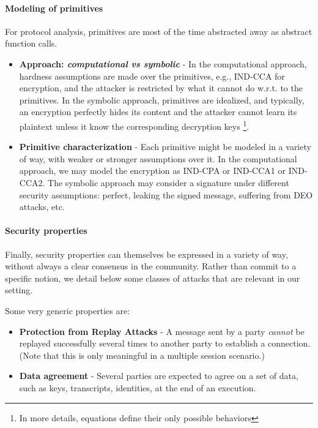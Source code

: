 \documentclass{article}
\begin{document}
 \paragraph{Modeling of  primitives} For protocol analysis, primitives are most of the time abstracted away as abstract function calls. 

 \begin{itemize}
 \item \textbf{Approach: \emph{computational vs symbolic}} - In the computational approach, hardness assumptions are made over the primitives, e.g., IND-CCA for encryption, and the attacker is restricted by what it cannot do w.r.t. to the primitives. In the symbolic approach, primitives are idealized, and typically, an encryption perfectly hides its content and the attacker cannot learn its plaintext unless it know the corresponding decryption keys \footnote{In more details, equations define their only possible behaviors}.
\item \textbf{Primitive characterization} - Each primitive might be modeled in a variety of way, with weaker or stronger assumptions over it. In the computational approach, we may model the encryption as IND-CPA or IND-CCA1 or IND-CCA2. The symbolic approach may consider a signature under different security assumptions: perfect, leaking the signed message, suffering from DEO attacks, etc.    
\end{itemize}

\paragraph{Security properties}

Finally, security properties can themselves be expressed in a variety of way, without always a clear consensus in the community. Rather than commit to a specific notion, we detail below some classes of attacks that are relevant in our setting.

Some very generic properties are:
\begin{itemize}
\item \textbf{Protection from Replay Attacks} - A message sent by a party \emph{cannot} be replayed successfully several times to another party to establish a connection. (Note that this is only meaningful in a multiple session scenario.)
\item \textbf{Data agreement} - Several parties are expected to agree on a set of data, such as keys, transcripts, identities, at the end of an execution.
\end{itemize}
\end{document}
